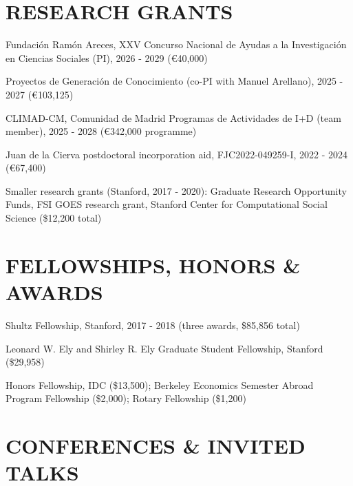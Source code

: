 \documentclass[margin]{res} %
\begin{document}
\begin{resume}

\section{RESEARCH GRANTS}

		Fundaci\'on Ram\'on Areces, XXV Concurso Nacional de Ayudas a la Investigaci\'on en Ciencias Sociales (PI), 2026 - 2029 (\euro{40,000})

		Proyectos de Generaci\'on de Conocimiento (co-PI with Manuel Arellano), 2025 - 2027 (\euro{103,125})

		CLIMAD-CM, Comunidad de Madrid Programas de Actividades de I+D (team member), 2025 - 2028 (\euro{342,000} programme)

		Juan de la Cierva postdoctoral incorporation aid, FJC2022-049259-I, 2022 - 2024 (\euro{67,400})

		Smaller research grants (Stanford, 2017 - 2020): Graduate Research Opportunity Funds, FSI GOES research grant, Stanford Center for Computational Social Science (\$12,200 total)


\section{FELLOWSHIPS, HONORS \& AWARDS}

		Shultz Fellowship, Stanford, 2017 - 2018 (three awards, \$85,856 total)

		Leonard W. Ely and Shirley R. Ely Graduate Student Fellowship, Stanford (\$29,958)

		Honors Fellowship, IDC (\$13,500); Berkeley Economics Semester Abroad Program Fellowship (\$2,000); Rotary Fellowship (\$1,200)

 
\section{CONFERENCES \& INVITED TALKS} 
\vspace{2em}


\end{resume}
\end{document}
